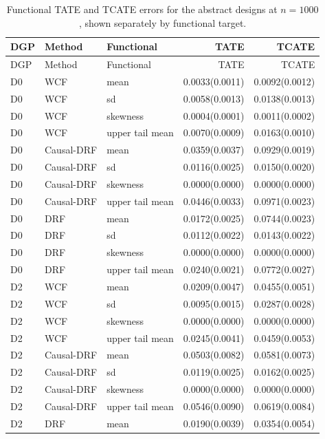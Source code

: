 \begingroup
\scriptsize
\setlength{\tabcolsep}{4pt}
\begin{longtable}{lllrr}
\caption{Functional TATE and TCATE errors for the abstract designs at $n=1000$, shown separately by functional target.}\label{tab:revision-functional-abstract}\\
\toprule
DGP & Method & Functional & TATE & TCATE \\
\midrule
\endfirsthead
\toprule
DGP & Method & Functional & TATE & TCATE \\
\midrule
\endhead
D0 & WCF & mean & 0.0033(0.0011) & 0.0092(0.0012) \\
D0 & WCF & sd & 0.0058(0.0013) & 0.0138(0.0013) \\
D0 & WCF & skewness & 0.0004(0.0001) & 0.0011(0.0002) \\
D0 & WCF & upper tail mean & 0.0070(0.0009) & 0.0163(0.0010) \\
D0 & Causal-DRF & mean & 0.0359(0.0037) & 0.0929(0.0019) \\
D0 & Causal-DRF & sd & 0.0116(0.0025) & 0.0150(0.0020) \\
D0 & Causal-DRF & skewness & 0.0000(0.0000) & 0.0000(0.0000) \\
D0 & Causal-DRF & upper tail mean & 0.0446(0.0033) & 0.0971(0.0023) \\
D0 & DRF & mean & 0.0172(0.0025) & 0.0744(0.0023) \\
D0 & DRF & sd & 0.0112(0.0022) & 0.0143(0.0022) \\
D0 & DRF & skewness & 0.0000(0.0000) & 0.0000(0.0000) \\
D0 & DRF & upper tail mean & 0.0240(0.0021) & 0.0772(0.0027) \\
D2 & WCF & mean & 0.0209(0.0047) & 0.0455(0.0051) \\
D2 & WCF & sd & 0.0095(0.0015) & 0.0287(0.0028) \\
D2 & WCF & skewness & 0.0000(0.0000) & 0.0000(0.0000) \\
D2 & WCF & upper tail mean & 0.0245(0.0041) & 0.0459(0.0053) \\
D2 & Causal-DRF & mean & 0.0503(0.0082) & 0.0581(0.0073) \\
D2 & Causal-DRF & sd & 0.0119(0.0025) & 0.0162(0.0025) \\
D2 & Causal-DRF & skewness & 0.0000(0.0000) & 0.0000(0.0000) \\
D2 & Causal-DRF & upper tail mean & 0.0546(0.0090) & 0.0619(0.0084) \\
D2 & DRF & mean & 0.0190(0.0039) & 0.0354(0.0054) \\

\end{longtable}
